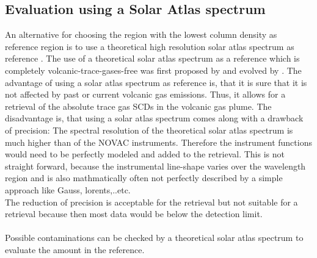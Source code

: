 \subsection*{Evaluation using a Solar Atlas spectrum \label{kuruz}}
An alternative for choosing the region with the lowest column density as reference region is to use a theoretical high resolution solar atlas spectrum as reference \citep{chance2010improved}.
The use of a theoretical solar atlas spectrum as a reference which is completely volcanic-trace-gases-free was first proposed by \cite{salerno2009novel} and evolved by \citep{lubcke2014bro}.
The advantage of using a solar atlas spectrum as reference is, that it is sure that it is not affected by past or current volcanic gas emissions. Thus, it allows for a retrieval of the absolute trace gas SCDs in the volcanic gas plume. The disadvantage is, that using a solar atlas spectrum comes along with a drawback of precision: The spectral resolution of the theoretical solar atlas spectrum is much  higher than of the NOVAC instruments. Therefore the instrument functions would need to be perfectly modeled and added to the retrieval. This is not straight forward, because the instrumental line-shape varies over the wavelength region and is also mathmatically often not perfectly described by a simple approach like Gauss, lorents,..etc.\\ 
The reduction of precision is acceptable for the
 retrieval but not suitable for a  retrieval because then most data would be below the detection limit.\\
%
\\
%
Possible contaminations can be checked
by a theoretical solar atlas spectrum to evaluate the  amount in the reference.\\

%
